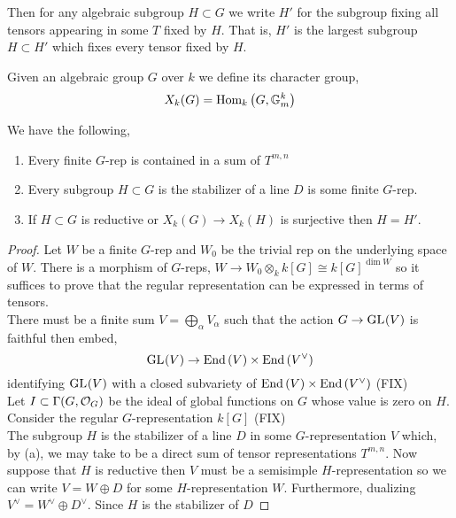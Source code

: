 \documentclass[12pt]{article}
\begin{document}
\begin{definition}
Then for any algebraic subgroup $H \subset G$ we write $H'$ for the subgroup fixing all tensors appearing in some $T$ fixed by $H$. That is, $H'$ is the largest subgroup $H \subset H'$ which fixes every tensor fixed by $H$. 
\end{definition}

\begin{definition}
Given an algebraic group $G$ over $k$ we define its character group,
\[ X_k(G) = \text{Hom}_{k}\left( G, \mathbb{G}_m^k \right) \]
\end{definition}

\begin{theorem}
We have the following,
\begin{enumerate}
\item Every finite $G$-rep is contained in a sum of $T^{m, n}$
\item Every subgroup $H \subset G$ is the stabilizer of a line $D$ is some finite $G$-rep.
\item If $H \subset G$ is reductive or $X_k(G) \to X_k(H)$ is surjective then $H = H'$.
\end{enumerate}
\end{theorem}

\begin{proof}
Let $W$ be a finite $G$-rep and $W_0$ be the trivial rep on the underlying space of $W$. There is a morphism of $G$-reps, $W \to W_0 \otimes_k k[G] \cong k[G]^{\dim{W}}$ so it suffices to prove that the regular representation can be expressed in terms of tensors.
\bigskip\\
There must be a finite sum $V = \bigoplus_{\alpha} V_\alpha$ such that the action $G \to \mathrm{GL}_{}(V)$ is faithful then embed,
\[ \mathrm{GL}_{}(V) \to \text{End}\left( V \right) \times \text{End}\left( V^\vee \right) \]
identifying $\mathrm{GL}_{}(V)$ with a closed subvariety of $\text{End}\left( V \right) \times \text{End}\left( V^\vee \right)$
(FIX)
\bigskip\\
Let $I \subset \Gamma(G, \mathcal{O}_{G})$ be the ideal of global functions on $G$ whose value is zero on $H$. Consider the regular $G$-representation $k[G]$ 
(FIX)
\bigskip\\
The subgroup $H$ is the stabilizer of a line $D$ in some $G$-representation $V$ which, by (a), we may take to be a direct sum of tensor representations $T^{m,n}$. Now suppose that $H$ is reductive then $V$ must be a semisimple $H$-representation so we can write $V = W \oplus D$ for some $H$-representation $W$. Furthermore, dualizing $V^\vee = W^\vee \oplus D^\vee$. Since $H$ is the stabilizer of $D$ 
\end{proof}
\end{document}
